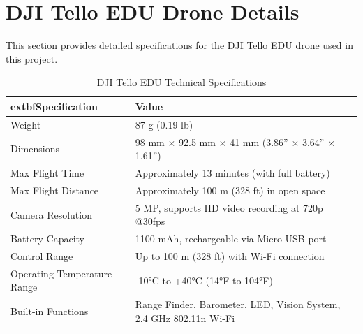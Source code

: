 \section{DJI Tello EDU Drone Details}\label{sec:tello_details}
This section provides detailed specifications for the DJI Tello EDU drone used in this project.
\begin{table}[htbp]
	\centering
	\caption{DJI Tello EDU Technical Specifications}
	\label{tab:tello_edu_specs}
	\begin{tabular}{|l|p{9cm}|}
		\hline
			extbf{Specification} & \textbf{Value} \\
		\hline
		Weight & 87 g (0.19 lb) \\
		\hline
		Dimensions & 98 mm $\times$ 92.5 mm $\times$ 41 mm (3.86'' $\times$ 3.64'' $\times$ 1.61'') \\
		\hline
		Max Flight Time & Approximately 13 minutes (with full battery) \\
		\hline
		Max Flight Distance & Approximately 100 m (328 ft) in open space \\
		\hline
		Camera Resolution & 5 MP, supports HD video recording at 720p @30fps \\
		\hline
		Battery Capacity & 1100 mAh, rechargeable via Micro USB port \\
		\hline
		Control Range & Up to 100 m (328 ft) with Wi-Fi connection \\
		\hline
		Operating Temperature Range & -10°C to +40°C (14°F to 104°F) \\
		\hline
		Built-in Functions & Range Finder, Barometer, LED, Vision System, 2.4 GHz 802.11n Wi-Fi \\
		\hline
	\end{tabular}
\end{table}

